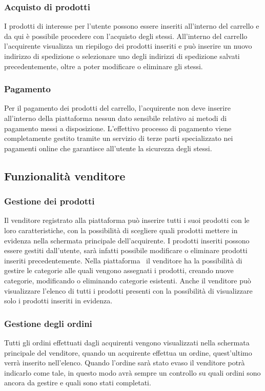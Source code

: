 \subsubsection*{Acquisto di prodotti}
I prodotti di interesse per l'utente possono essere inseriti all'interno del carrello e da qui è possibile procedere con l'acquisto degli stessi. All'interno del carrello l'acquirente visualizza un riepilogo dei prodotti inseriti e può inserire un nuovo indirizzo di spedizione o selezionare uno degli indirizzi di spedizione salvati precedentemente, oltre a poter modificare o eliminare gli stessi. 
\subsubsection*{Pagamento}
Per il pagamento dei prodotti del carrello, l'acquirente non deve inserire all'interno della piattaforma nessun dato sensibile relativo ai metodi di pagamento messi a disposizione. L'effettivo processo di pagamento viene completamente gestito tramite un servizio di terze parti specializzato nei pagamenti online che garantisce all'utente la sicurezza degli stessi.
\subsection{Funzionalità venditore}
\subsubsection*{Gestione dei prodotti}
Il venditore registrato alla piattaforma può inserire tutti i suoi prodotti con le loro caratteristiche, con la possibilità di scegliere quali prodotti mettere in evidenza nella schermata principale dell'acquirente. I prodotti inseriti possono essere gestiti dall'utente, sarà infatti possibile modificare o eliminare prodotti inseriti precedentemente. Nella piattaforma \NomeProgetto\ il venditore ha la possibilità di gestire le categorie alle quali vengono assegnati i prodotti, creando nuove categorie, modificando o eliminando categorie esistenti. Anche il venditore può visualizzare l'elenco di tutti i prodotti presenti con la possibilità di visualizzare solo i prodotti inseriti in evidenza.
\subsubsection*{Gestione degli ordini}
Tutti gli ordini effettuati dagli acquirenti vengono visualizzati nella schermata principale del venditore, quando un acquirente effettua un ordine, quest'ultimo verrà inserito nell'elenco. Quando l'ordine sarà stato evaso il venditore potrà indicarlo come tale, in questo modo avrà sempre un controllo su quali ordini sono ancora da gestire e quali sono stati completati.